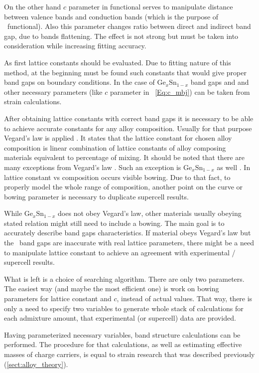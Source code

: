 On the other hand $c$ parameter in functional serves to manipulate distance between valence bands and conduction bands (which is the purpose of \mBJLDA\ functional).
Also this parameter changes ratio between direct and indirect band gap, due to bands flattening.
The effect is not strong but must be taken into consideration while increasing fitting accuracy.

As first lattice constants should be evaluated.
Due to fitting nature of this method, at the beginning must be found such constants that would give proper band gaps on boundary conditions.
In the case of $\mathrm{Ge}_x\mathrm{Sn}_{1-x}$ band gaps and and other necessary parameters (like $c$ parameter in \mBJLDA\ \ref{Eq:c_mbj}) can be taken from strain calculations.

After obtaining lattice constants with correct band gaps it is necessary to be able to achieve accurate constants for any alloy composition.
Usually for that purpose Vegard's law is applied \cite{vegard1}.
It states that the lattice constant for chosen alloy composition is linear combination of lattice constants of alloy composing materials equivalent to percentage of mixing.
It should be noted that there are many exceptions from Vegard's law \cite{vegard2,vegard3,vegard4}.
Such an exception is $\mathrm{Ge}_x\mathrm{Sn}_{1-x}$ as well \cite{Polak_2017}.
In lattice constant vs composition occurs visible bowing.
Due to that fact, to properly model the whole range of composition, another point on the curve or bowing parameter is necessary to duplicate supercell results.

While $\mathrm{Ge}_x\mathrm{Sn}_{1-x}$ does not obey Vegard's law, other materials usually obeying stated relation might still need to include a bowing.
The main goal is to accurately describe band gaps characteristics.
If material obeys Vegard's law but the \AM\ band gaps are inaccurate with real lattice parameters, there might be a need to manipulate lattice constant to achieve an agreement with experimental / supercell results.

What is left is a choice of searching algorithm.
There are only two parameters.
The easiest way (and maybe the most efficient one) is work on bowing parameters for lattice constant and $c$, instead of actual values.
That way, there is only a need to specify two variables to generate whole stack of calculations for each admixture amount, that experimental (or supercell) data are provided.

Having parameterized necessary variables, band structure calculations can be performed.
The procedure for that calculations, as well as estimating effective masses of charge carriers, is equal to strain research that was described previously (\ref{sect:alloy_theory}).


